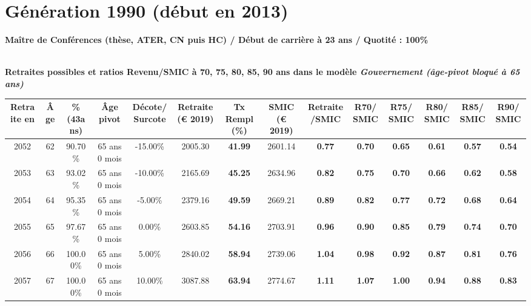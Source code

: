 \newpage 
 
\section{Génération 1990 (début en 2013)\label{MCF_100_1990_23_0}} 
 
{\bf \noindent Maître de Conférences (thèse, ATER, CN puis HC) / Début de carrière à 23 ans / Quotité : 100\%}  ~ 

 ~\\{\bf \noindent Retraites possibles et ratios Revenu/SMIC à 70, 75, 80, 85, 90 ans dans le modèle \emph{Gouvernement (âge-pivot bloqué à 65 ans)}}  
 
\begin{adjustbox}{max width=\textwidth} 
\begin{tabular}[htb]{|c|c||c|c|c||c|c||c|c||c|c|c|c|c|} 
\hline 
 Retraite en &  Âge &  \%(43ans) &  Âge pivot &  Décote/Surcote &  Retraite (\euro{} 2019) &  Tx Rempl(\%) &  SMIC (\euro{} 2019) &  Retraite/SMIC &  R70/SMIC &  R75/SMIC &  R80/SMIC &  R85/SMIC &  R90/SMIC \\ 
\hline \hline 
 2052 &  62 &  90.70\% &  65 ans 0 mois &  -15.00\% &  2005.30 &  {\bf 41.99} &  2601.14 &  {\bf {\color{red} 0.77}} &  {\bf {\color{red} 0.70}} &  {\bf {\color{red} 0.65}} &  {\bf {\color{red} 0.61}} &  {\bf {\color{red} 0.57}} &  {\bf {\color{red} 0.54}} \\ 
\hline 
 2053 &  63 &  93.02\% &  65 ans 0 mois &  -10.00\% &  2165.69 &  {\bf 45.25} &  2634.96 &  {\bf {\color{red} 0.82}} &  {\bf {\color{red} 0.75}} &  {\bf {\color{red} 0.70}} &  {\bf {\color{red} 0.66}} &  {\bf {\color{red} 0.62}} &  {\bf {\color{red} 0.58}} \\ 
\hline 
 2054 &  64 &  95.35\% &  65 ans 0 mois &  -5.00\% &  2379.16 &  {\bf 49.59} &  2669.21 &  {\bf {\color{red} 0.89}} &  {\bf {\color{red} 0.82}} &  {\bf {\color{red} 0.77}} &  {\bf {\color{red} 0.72}} &  {\bf {\color{red} 0.68}} &  {\bf {\color{red} 0.64}} \\ 
\hline 
 2055 &  65 &  97.67\% &  65 ans 0 mois &  0.00\% &  2603.85 &  {\bf 54.16} &  2703.91 &  {\bf {\color{red} 0.96}} &  {\bf {\color{red} 0.90}} &  {\bf {\color{red} 0.85}} &  {\bf {\color{red} 0.79}} &  {\bf {\color{red} 0.74}} &  {\bf {\color{red} 0.70}} \\ 
\hline 
 2056 &  66 &  100.00\% &  65 ans 0 mois &  5.00\% &  2840.02 &  {\bf 58.94} &  2739.06 &  {\bf 1.04} &  {\bf {\color{red} 0.98}} &  {\bf {\color{red} 0.92}} &  {\bf {\color{red} 0.87}} &  {\bf {\color{red} 0.81}} &  {\bf {\color{red} 0.76}} \\ 
\hline 
 2057 &  67 &  100.00\% &  65 ans 0 mois &  10.00\% &  3087.88 &  {\bf 63.94} &  2774.67 &  {\bf 1.11} &  {\bf 1.07} &  {\bf 1.00} &  {\bf {\color{red} 0.94}} &  {\bf {\color{red} 0.88}} &  {\bf {\color{red} 0.83}} \\ 
\hline 
\hline 
\end{tabular} 
\end{adjustbox} 
 
